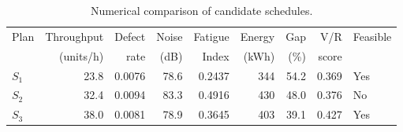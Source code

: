 \begin{table}[htbp]
\centering
\caption{Numerical comparison of candidate schedules.}
\label{tab:numerical-sim}
\small
\begin{tabular}{@{}lrrrrrrrl@{}}
\toprule
Plan & Throughput & Defect & Noise & Fatigue & Energy & Gap & V/R & Feasible \\
     & (units/h)  & rate   & (dB)  & Index   & (kWh)  & (\%) & score &         \\
\midrule
$S_{1}$ & 23.8 & 0.0076 & 78.6 & 0.2437 & 344 & 54.2 & 0.369 & Yes \\
$S_{2}$ & 32.4 & 0.0094 & 83.3 & 0.4916 & 430 & 48.0 & 0.376 & No \\
$S_{3}$ & 38.0 & 0.0081 & 78.9 & 0.3645 & 403 & 39.1 & 0.427 & Yes \\
\bottomrule
\end{tabular}
\end{table}
